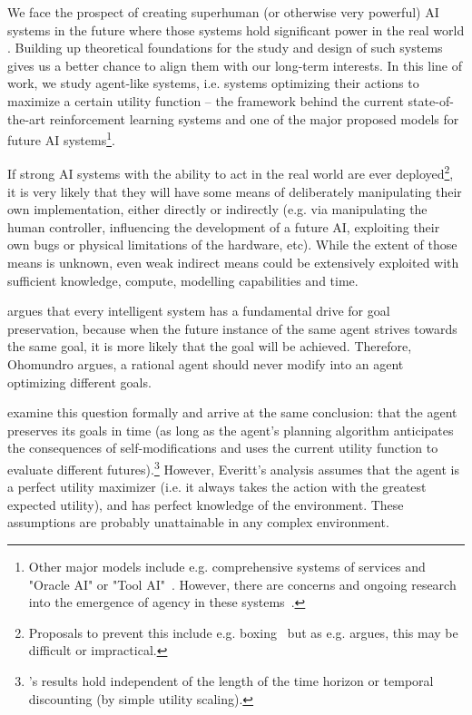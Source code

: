 We face the prospect of creating superhuman (or otherwise very powerful) AI systems in the future where those systems hold significant power in the real world \cite{Superintelligence,russell2019human}. Building up theoretical foundations for the study and design of such systems gives us a better chance to align them with our long-term interests. In this line of work, we study agent-like systems, i.e. systems optimizing their actions to maximize a certain utility function -- the framework behind the current state-of-the-art reinforcement learning systems and one of the major proposed models for future AI systems\footnote{Other major models include e.g. comprehensive systems of services \cite{drexler2019reframing} and "Oracle AI" or "Tool AI"~\cite{OracleAI}. However, there are concerns and ongoing research into the emergence of agency in these systems~\cite{omohundro2008basic,miller2020agi}.}.

If strong AI systems with the ability to act in the real world are ever deployed\footnote{Proposals to prevent this include e.g. boxing~\cite{Superintelligence} but as e.g. \citet{Leakproofing} argues, this may be difficult or impractical.}, it is very likely that they will have some means of deliberately manipulating their own implementation, either directly or indirectly (e.g. via manipulating the human controller, influencing the development of a future AI, exploiting their own bugs or physical limitations of the hardware, etc). While the extent of those means is unknown, even weak indirect means could be extensively exploited with sufficient knowledge, compute, modelling capabilities and time.

\smallskip
\citet{omohundro2008basic} argues that every intelligent system has a fundamental drive for goal preservation, because when the future instance of the same agent strives towards the same goal, it is more likely that the goal will be achieved. Therefore, Ohomundro argues, a rational agent should never modify into an agent optimizing different goals.

\citet{everitt} examine this question formally and arrive at the same conclusion: that the agent preserves its goals in time (as long as the agent's planning algorithm anticipates the consequences of self-modifications and uses the current utility function to evaluate different futures).\footnote{\citet{everitt}'s results hold independent of the length of the time horizon or temporal discounting (by simple utility scaling).
} However, Everitt's analysis assumes that the agent is a perfect utility maximizer (i.e. it always takes the action with the greatest expected utility), and has perfect knowledge of the environment. These assumptions are probably unattainable in any complex environment.

